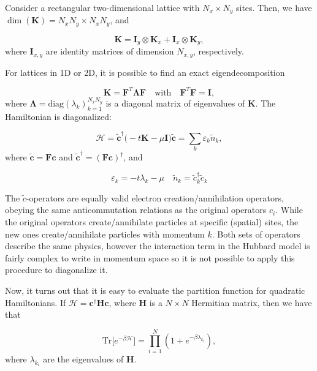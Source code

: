 \documentclass[10pt, twocolumn, twoside]{article}
\begin{document}
Consider a rectangular two-dimensional lattice with $N_x \times N_y$ sites. Then, we have $\dim(\bm K) = N_x N_y \times N_x N_y $, and

\begin{equation}
\bm K = \bm I_y \otimes \bm K_x + \bm I_x \otimes \bm K_y ,
\end{equation}
where $\bm I_{x, y}$ are identity matrices of dimension $N_{x, y}$, respectively.

For lattices in 1D or 2D, it is possible to find an exact eigendecomposition

\begin{equation}
\bm K = \bm F^T \bm \Lambda \bm F \quad \text{with}  \quad \bm F^T \bm F = \bm I ,
\end{equation}
where $\bm \Lambda = \text{diag}(\lambda_k)_{k = 1}^{N_x N_y}$ is a diagonal matrix of eigenvalues of $\bm K$. The Hamiltonian is diagonalized:

\begin{equation}\label{eq:quadraticH}
\mathcal{H} =\tilde{\bm c}^\dagger \big( -t \bm K - \mu \bm I \big) \tilde{\bm c} = \sum_k \varepsilon_k \tilde{n}_k ,
\end{equation}
where $\tilde{\bm c} = \bm F \bm c$ and $\tilde{\bm c}^\dagger = (\bm F \bm c)^\dagger$, and

\begin{equation}
\varepsilon_k = -t \lambda_k - \mu \quad \tilde{n}_k = \tilde{c}_k^\dagger \tilde{c}_k
\end{equation}

The $\tilde{c}$-operators are equally valid electron creation/annihilation operators, obeying the same anticommutation relations as the original operators $c_i$. While the original operators create/annihilate particles at specific (spatial) sites, the new ones create/annihilate particles with momentum $k$. Both sets of operators describe the same physics, however the interaction term in the Hubbard model is fairly complex to write in momentum space so it is not possible to apply this procedure to diagonalize it.

\bigskip

Now, it turns out that it is easy to evaluate the partition function for quadratic Hamiltonians. If $\mathcal{H} = \bm c^\dagger \bm H \bm c$, where $\bm H$ is a $N \times N$ Hermitian matrix, then we have that

\begin{equation}\label{eq:trace_quadratic}
\text{Tr} \big[ e^{-\beta \mathcal{H} } \big] = \prod_{i=1}^N ( 1 + e^{-\beta \lambda_{k_i} } ) ,
\end{equation}
where $\lambda_{k_i}$ are the eigenvalues of $\bm H$.
\end{document}
